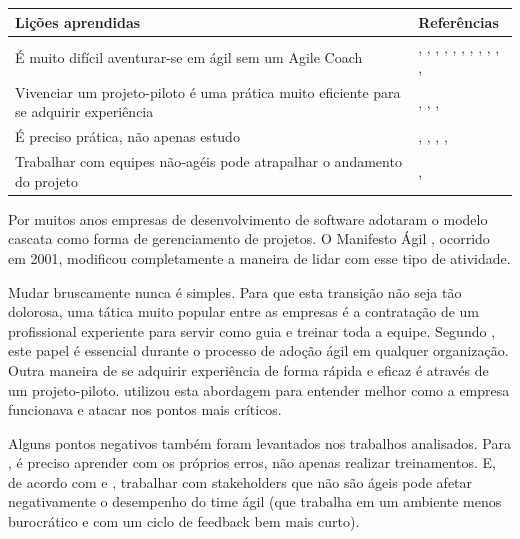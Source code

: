 \begin{table}[H]
	\centering
	\begin{tabularx}{\linewidth}{ | X | p{5cm} | } \hline \textbf{Lições aprendidas} & \textbf{Referências} \\ \hline
		É muito difícil aventurar-se em ágil sem um Agile Coach & \cite{Hajjdiab2011}, \cite{Block2011}, \cite{Adobe2012}, \cite{Cisco2011}, \cite{Lapham2012}, \cite{Eunha2012}, \cite{Claudia2013}, \cite{Stefano2013}, \cite{Rodrigues2013}, \cite{Bastos2013}, \cite{Maciel2013}, \cite{Karaj2013} \\ \hline
		Vivenciar um projeto-piloto é uma prática muito eficiente para se adquirir experiência & \cite{Hajjdiab2011}, \cite{Cisco2011}, \cite{Rodrigues2013}, \cite{Maciel2013} \\ \hline
		É preciso prática, não apenas estudo & \cite{Hajjdiab2011}, \cite{Asnawi2012}, \cite{Claudia2013}, \cite{Piegas2012}, \cite{Vieira2013} \\ \hline
		Trabalhar com equipes não-agéis pode atrapalhar o andamento do projeto & \cite{Adobe2012}, \cite{Maciel2013} \\ \hline
	\end{tabularx}
\end{table}

Por muitos anos empresas de desenvolvimento de software adotaram o modelo cascata como forma de gerenciamento de projetos. O Manifesto Ágil \cite{agileManifesto}, ocorrido em 2001, modificou completamente a maneira de lidar com esse tipo de atividade.

Mudar bruscamente nunca é simples. Para que esta transição não seja tão dolorosa, uma tática muito popular entre as empresas é a contratação de um profissional experiente para servir como guia e treinar toda a equipe. Segundo \cite{Hajjdiab2011}, este papel é essencial durante o processo de adoção ágil em qualquer organização. Outra maneira de se adquirir experiência de forma rápida e eficaz é através de um projeto-piloto. \cite{Cisco2011} utilizou esta abordagem para entender melhor como a empresa funcionava e atacar nos pontos mais críticos.

Alguns pontos negativos também foram levantados nos trabalhos analisados. Para \cite{Piegas2012}, é preciso aprender com os próprios erros, não apenas realizar treinamentos. E, de acordo com \cite{Adobe2012} e \cite{Maciel2013}, trabalhar com stakeholders que não são ágeis pode afetar negativamente o desempenho do time ágil (que trabalha em um ambiente menos burocrático e com um ciclo de feedback bem mais curto).

